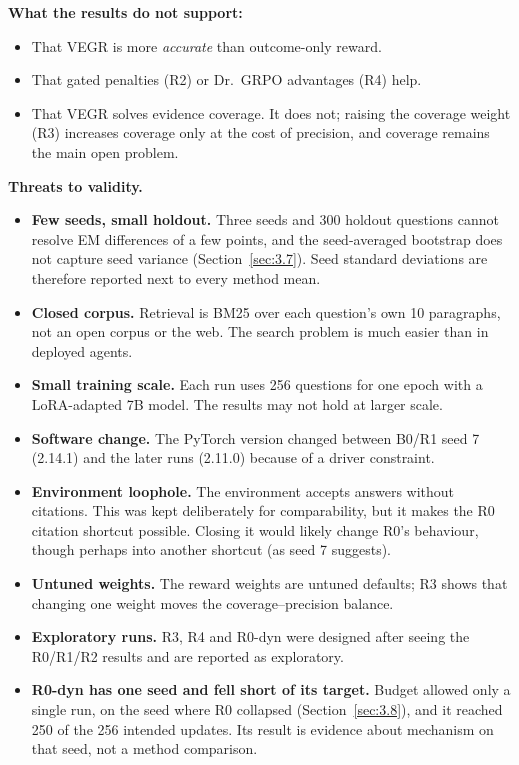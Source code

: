 \textbf{What the results do not support:}

\begin{itemize}
\tightlist
\item
  That VEGR is more \emph{accurate} than outcome-only reward.
\item
  That gated penalties (R2) or Dr.~GRPO advantages (R4) help.
\item
  That VEGR solves evidence coverage. It does not; raising the coverage
  weight (R3) increases coverage only at the cost of precision, and
  coverage remains the main open problem.
\end{itemize}

\textbf{Threats to validity.}

\begin{itemize}
\tightlist
\item
  \textbf{Few seeds, small holdout.} Three seeds and 300 holdout
  questions cannot resolve EM differences of a few points, and the
  seed-averaged bootstrap does not capture seed variance
  (Section~\ref{sec:3.7}). Seed standard deviations are therefore
  reported next to every method mean.
\item
  \textbf{Closed corpus.} Retrieval is BM25 over each question's own 10
  paragraphs, not an open corpus or the web. The search problem is much
  easier than in deployed agents.
\item
  \textbf{Small training scale.} Each run uses 256 questions for one
  epoch with a LoRA-adapted 7B model. The results may not hold at larger
  scale.
\item
  \textbf{Software change.} The PyTorch version changed between B0/R1
  seed 7 (2.14.1) and the later runs (2.11.0) because of a driver
  constraint.
\item
  \textbf{Environment loophole.} The environment accepts answers without
  citations. This was kept deliberately for comparability, but it makes
  the R0 citation shortcut possible. Closing it would likely change R0's
  behaviour, though perhaps into another shortcut (as seed 7 suggests).
\item
  \textbf{Untuned weights.} The reward weights are untuned defaults; R3
  shows that changing one weight moves the coverage--precision balance.
\item
  \textbf{Exploratory runs.} R3, R4 and R0-dyn were designed after
  seeing the R0/R1/R2 results and are reported as exploratory.
\item
  \textbf{R0-dyn has one seed and fell short of its target.} Budget
  allowed only a single run, on the seed where R0 collapsed
  (Section~\ref{sec:3.8}), and it reached 250 of the 256 intended
  updates. Its result is evidence about mechanism on that seed, not a
  method comparison.
\end{itemize}
